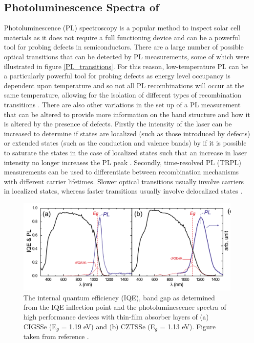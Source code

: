 \subsection{Photoluminescence Spectra of \CZTS}\label{CZTS_PL_section}
Photoluminescence (PL) spectroscopy is a popular method to inspect solar cell materials as it does not require a full functioning device and can be a powerful tool for probing defects in semiconductors. There are a large number of possible optical transitions that can be detected by PL measurements, some of which were illustrated in figure \ref{PL_transitions}. For this reason, low-temperature PL can be a particularly powerful tool for probing defects as energy level occupancy is dependent upon temperature and so not all PL recombinations will occur at the same temperature, allowing for the isolation of different types of recombination transitions \cite{spatial_resolved_book}. There are also other variations in the set up of a PL measurement that can be altered to provide more information on the band structure and how it is altered by the presence of defects. Firstly the intensity of the laser can be increased to determine if states are localized (such as those introduced by defects) or extended states (such as the conduction and valence bands) by if it is possible to saturate the states in the case of localized states such that an increase in laser intensity no longer increases the PL peak \cite{Gershon}. Secondly, time-resolved PL (TRPL) measurements  can be used to differentiate between recombination mechanisms with different carrier lifetimes. Slower optical transitions usually involve carriers in localized states, whereas faster transitions usually involve delocalized states \cite{Gershon}.

\begin{figure}[h!]
  \centering
    \includegraphics[width=1.0\textwidth]{figures/CZTS+CIGS_PL.png}
    \caption{The internal quantum efficiency (IQE), band gap as determined from the IQE inflection point and the photoluminescence spectra of high performance devices with thin-film absorber layers of (a) CIGSSe (E$_g$ = 1.19 eV) and (b) CZTSSe (E$_g$ = 1.13 eV). Figure taken from reference .}
  \label{CZTS+CIGS_PL}
\end{figure}

